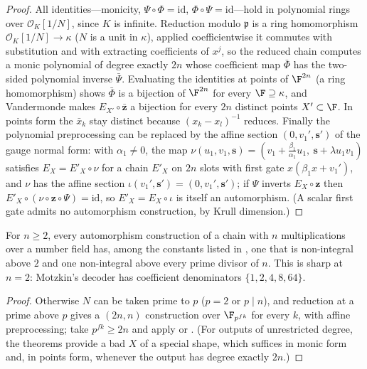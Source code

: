 \begin{proof}
All identities---monicity, $\Psi\circ\Phi=\mathrm{id}$, $\Phi\circ\Psi=\mathrm{id}$---hold
in polynomial rings over $\mathcal O_K[1/N]$, since $K$ is infinite.  Reduction modulo
$\mathfrak p$ is a ring homomorphism $\mathcal O_K[1/N]\to\kappa$ ($N$ is a unit in
$\kappa$), applied coefficientwise it commutes with substitution and with extracting
coefficients of $x^j$, so the reduced chain computes a monic polynomial of degree exactly
$2n$ whose coefficient map $\bar\Phi$ has the two-sided polynomial inverse $\bar\Psi$.
Evaluating the identities at points of $\F^{2n}$ (a ring homomorphism) shows $\bar\Phi$ is
a bijection of $\F^{2n}$ for every $\F\supseteq\kappa$, and Vandermonde makes
$E_{X'}\circ\bar{\mathbf z}$ a bijection for every $2n$ distinct points $X'\subset\F$.  In
points form the $\bar x_k$ stay distinct because $(x_k-x_l)^{-1}$ reduces.  Finally the
polynomial preprocessing can be replaced by the affine section $(0,v_1',\mathbf s')$ of
the gauge normal form: with $\alpha_1\neq0$, the map
$\nu(u_1,v_1,\mathbf s)=(v_1+\tfrac{\beta_1}{\alpha_1}u_1,\ \mathbf s+\lambda u_1v_1)$
satisfies $E_X=E'_X\circ\nu$ for a chain $E'_X$ on $2n$ slots with first gate
$x(\beta_1x+v_1')$, and $\nu$ has the affine section $\iota(v_1',\mathbf s')=(0,v_1',\mathbf s')$;
if $\Psi$ inverts $E_X\circ\mathbf z$ then $E'_X\circ(\nu\circ\mathbf z\circ\Psi)=\mathrm{id}$,
so $E'_X=E_X\circ\iota$ is itself an automorphism.  (A scalar first gate admits no
automorphism construction, by Krull dimension.)
\end{proof}

\begin{corollary}[integrality]
\label{cor:charp-integrality}
For $n\ge2$, every automorphism construction of a chain with $n$ multiplications over a
number field has, among the constants listed in , one that is
non-integral above $2$ and one non-integral above every prime divisor of $n$.  This is
sharp at $n=2$: Motzkin's decoder has coefficient denominators $\{1,2,4,8,64\}$.
\end{corollary}

\begin{proof}
Otherwise $N$ can be taken prime to $p$ ($p=2$ or $p\mid n$), and reduction at a prime
above $p$ gives a $(2n,n)$ construction over $\F_{p^{fk}}$ for every $k$, with affine
preprocessing; take $p^{fk}\ge2n$ and apply  or
.  (For outputs of unrestricted degree, the theorems provide a bad
$X$ of a special shape, which suffices in monic form and, in points form, whenever the
output has degree exactly $2n$.)
\end{proof}

